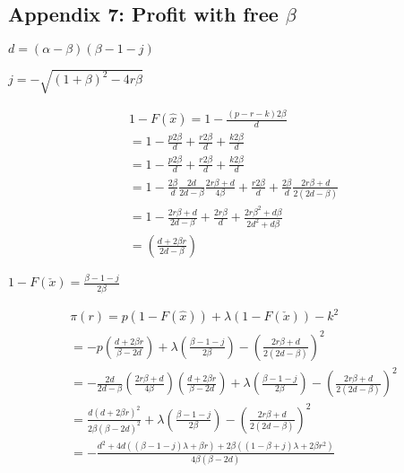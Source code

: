 \documentclass{article}
\begin{document}
\subsection{Appendix 7: Profit with free $\beta$}

$d = (\alpha-\beta)(\beta -1-j)$

$j =  - \sqrt{ (1+\beta)^{2}- 4 r \beta } $

\[
\begin{array}{ll}
1-F(\hat{x}) = 1 - \frac{(p-r-k)2\beta}{d} \\
= 1 - \frac{p2\beta}{d} + \frac{r2\beta}{d} + \frac{k2\beta}{d} \\
= 1 - \frac{p2\beta}{d} + \frac{r2\beta}{d} + \frac{k2\beta}{d} \\
= 1 - \frac{2\beta}{d}\frac{2d}{2d-\beta}\frac{2r\beta+d}{4\beta} + \frac{r2\beta}{d} + \frac{2\beta}{d}\frac{2r\beta+d}{2(2d-\beta)} \\
= 1 - \frac{2r\beta + d}{2d-\beta}+\frac{2r\beta}{d}+\frac{2r\beta^2+d \beta}{2d^2+d\beta} \\
=\left(\frac{d+2\beta r}{ 2d-\beta} \right)
\end{array}
\]

$1-F(\check{x}) = \frac{\beta-1-j}{2\beta}$

\[
\begin{array}{ll}
\pi(r) =  p(1-F(\hat{x})) + \lambda (1-F(\check{x})) -  k^2 \\
=  -p\left(\frac{d+2\beta r}{\beta - 2d}\right) + \lambda \left(\frac{\beta-1-j}{2\beta} \right) -  \left(\frac{2r\beta + d}{2(2d-\beta)}\right)^2 \\
=-\frac{2d}{2d-\beta}\left(\frac{2 r \beta +d}{4 \beta} \right)\left(\frac{d+2\beta r}{\beta - 2d}\right)+ \lambda \left(\frac{\beta-1-j}{2\beta} \right) -  \left(\frac{2r\beta + d}{2(2d-\beta)}\right)^2 \\
= \frac{d (d+2 \beta r)^2 }{2\beta (\beta-2 d)^2}+ \lambda \left(\frac{\beta-1-j}{2\beta} \right) -  \left(\frac{2r\beta + d}{2(2d-\beta)}\right)^2 \\
= -\frac{d^2+4d((\beta -1-j)\lambda+\beta r)+2 \beta((1-\beta +j)\lambda+2 \beta r^2) }{4 \beta (\beta - 2d)}
\end{array}
\]
\end{document}
